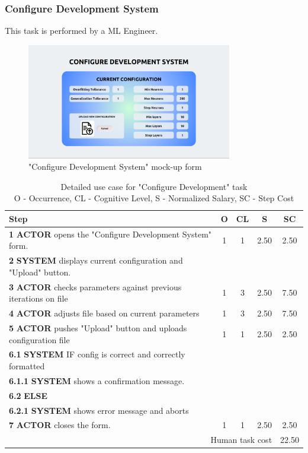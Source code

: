 \subsubsection{Configure Development System}

This task is performed by a ML Engineer.

\begin{figure}[H]
\centering
\includegraphics[width=0.8\textwidth]{figures/ui_configure_development.png}
\caption{"Configure Development System" mock-up form}
\end{figure}

\begin{table}[H]
\centering
\begin{tabularx}{\textwidth}{|X|c|c|c|c|}
\hline
\textbf{Step} & \textbf{O} & \textbf{CL} & \textbf{S} & \textbf{SC} \\
\hline
\textbf{1} \textbf{ACTOR} opens the "Configure Development System" form. & 1 & 1 & 2.50 & 2.50 \\
\hline
\textbf{2} \textbf{SYSTEM} displays current configuration and "Upload" button. & & & & \\
\hline
\textbf{3} \textbf{ACTOR} checks parameters against previous iterations on file & 1 & 3 & 2.50 & 7.50 \\
\hline
\textbf{4} \textbf{ACTOR} adjusts file based on current parameters & 1 & 3 & 2.50 & 7.50 \\
\hline
\textbf{5} \textbf{ACTOR} pushes "Upload" button and uploads configuration file & 1 & 1 & 2.50 & 2.50 \\
\hline
\textbf{6.1} \textbf{SYSTEM} IF config is correct and correctly formatted & & & & \\
\hline
\textbf{6.1.1} \textbf{SYSTEM} shows a confirmation message. & & & & \\
\hline
\textbf{6.2} \textbf{ELSE} & & & & \\
\hline
\textbf{6.2.1} \textbf{SYSTEM} shows error message and aborts & & & & \\
\hline
\textbf{7} \textbf{ACTOR} closes the form. & 1 & 1 & 2.50 & 2.50 \\
\hline
\multicolumn{4}{|r|}{Human task cost} & 22.50 \\
\hline
\end{tabularx}
\caption{Detailed use case for "Configure Development" task\\ 
O - Occurrence, CL - Cognitive Level, S - Normalized Salary, SC - Step Cost}
\label{table:configure_development_system}
\end{table}
